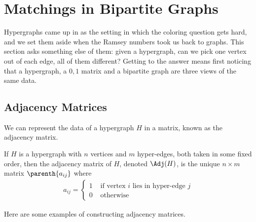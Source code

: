 \section{Matchings in Bipartite Graphs}

Hypergraphs came up in  as the setting in which the coloring question gets hard, and we set them aside when the Ramsey numbers took us back to graphs. This section asks something else of them: given a hypergraph, can we pick one vertex out of each edge, all of them different? Getting to the answer means first noticing that a hypergraph, a $0,1$ matrix and a bipartite graph are three views of the same data.

\subsection{Adjacency Matrices}

We can represent the data of a hypergraph $H$ in a matrix, known as the adjacency matrix.

\begin{boxdefinition}
    If $H$ is a hypergraph with $n$ vertices and $m$ hyper-edges, both taken in some fixed order, then the adjacency matrix of $H$, denoted $\Adj(H)$, is the unique $n \times m$ matrix $\parenth{a_{ij}}$ where
    \begin{align*}
        a_{ij} =
        \begin{cases}
            1 & \text{ if vertex $i$ lies in hyper-edge $j$} \\
            0 & \text{ otherwise}
        \end{cases}
    \end{align*}
\end{boxdefinition}

Here are some examples of constructing adjacency matrices.


